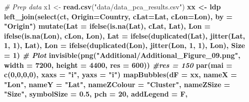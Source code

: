 \documentclass[
]{article}
\newenvironment{Shaded}{\begin{snugshade}}{\end{snugshade}}
\newcommand{\CommentTok}[1]{\textcolor[rgb]{0.56,0.35,0.01}{\textit{#1}}}
\newcommand{\DataTypeTok}[1]{\textcolor[rgb]{0.13,0.29,0.53}{#1}}
\newcommand{\DecValTok}[1]{\textcolor[rgb]{0.00,0.00,0.81}{#1}}
\newcommand{\FloatTok}[1]{\textcolor[rgb]{0.00,0.00,0.81}{#1}}
\newcommand{\KeywordTok}[1]{\textcolor[rgb]{0.13,0.29,0.53}{\textbf{#1}}}
\newcommand{\NormalTok}[1]{#1}
\newcommand{\OperatorTok}[1]{\textcolor[rgb]{0.81,0.36,0.00}{\textbf{#1}}}
\newcommand{\StringTok}[1]{\textcolor[rgb]{0.31,0.60,0.02}{#1}}
\begin{document}
\begin{Shaded}
\begin{Highlighting}[]
\CommentTok{# Prep data}
\NormalTok{x1 <-}\StringTok{ }\KeywordTok{read.csv}\NormalTok{(}\StringTok{"data/data_pca_results.csv"}\NormalTok{) }\OperatorTok{%
\NormalTok{xx <-}\StringTok{ }\NormalTok{ldp }\OperatorTok{%
\StringTok{  }\KeywordTok{left_join}\NormalTok{(}\KeywordTok{select}\NormalTok{(ct, }\DataTypeTok{Origin=}\NormalTok{Country, }\DataTypeTok{cLat=}\NormalTok{Lat, }\DataTypeTok{cLon=}\NormalTok{Lon), }\DataTypeTok{by =} \StringTok{"Origin"}\NormalTok{) }\OperatorTok{%
\StringTok{  }\KeywordTok{mutate}\NormalTok{(}\DataTypeTok{Lat =} \KeywordTok{ifelse}\NormalTok{(}\KeywordTok{is.na}\NormalTok{(Lat), cLat, Lat),}
         \DataTypeTok{Lon =} \KeywordTok{ifelse}\NormalTok{(}\KeywordTok{is.na}\NormalTok{(Lon), cLon, Lon),}
         \DataTypeTok{Lat =} \KeywordTok{ifelse}\NormalTok{(}\KeywordTok{duplicated}\NormalTok{(Lat), }\KeywordTok{jitter}\NormalTok{(Lat, }\DecValTok{1}\NormalTok{, }\DecValTok{1}\NormalTok{), Lat),}
         \DataTypeTok{Lon =} \KeywordTok{ifelse}\NormalTok{(}\KeywordTok{duplicated}\NormalTok{(Lon), }\KeywordTok{jitter}\NormalTok{(Lon, }\DecValTok{1}\NormalTok{, }\DecValTok{1}\NormalTok{), Lon), }\DataTypeTok{Size =} \DecValTok{1}\NormalTok{)}
\CommentTok{# Plot}
\KeywordTok{invisible}\NormalTok{(}\KeywordTok{png}\NormalTok{(}\StringTok{"Additional/Additional_Figure_09.png"}\NormalTok{, }
              \DataTypeTok{width =} \DecValTok{7200}\NormalTok{, }\DataTypeTok{height =} \DecValTok{4400}\NormalTok{, }\DataTypeTok{res =} \DecValTok{600}\NormalTok{)) }\CommentTok{#res = 150}
\KeywordTok{par}\NormalTok{(}\DataTypeTok{mai =} \KeywordTok{c}\NormalTok{(}\DecValTok{0}\NormalTok{,}\DecValTok{0}\NormalTok{,}\DecValTok{0}\NormalTok{,}\DecValTok{0}\NormalTok{), }\DataTypeTok{xaxs =} \StringTok{"i"}\NormalTok{, }\DataTypeTok{yaxs =} \StringTok{"i"}\NormalTok{)}
\KeywordTok{mapBubbles}\NormalTok{(}\DataTypeTok{dF =}\NormalTok{ xx, }\DataTypeTok{nameX =} \StringTok{"Lon"}\NormalTok{, }\DataTypeTok{nameY =} \StringTok{"Lat"}\NormalTok{, }\DataTypeTok{nameZColour =} \StringTok{"Cluster"}\NormalTok{,}
           \DataTypeTok{nameZSize =} \StringTok{"Size"}\NormalTok{, }\DataTypeTok{symbolSize =} \FloatTok{0.5}\NormalTok{, }\DataTypeTok{pch =} \DecValTok{20}\NormalTok{, }\DataTypeTok{addLegend =}\NormalTok{ F,}
}}}
\end{Highlighting}
\end{Shaded}
\end{document}

